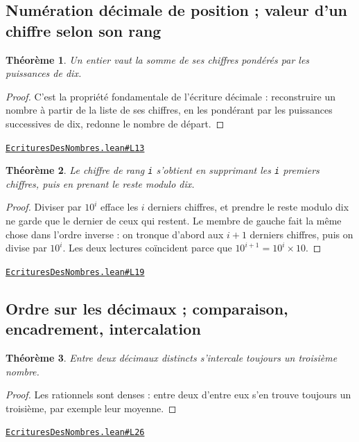 \documentclass[11pt,a4paper]{article}
\theoremstyle{definition}
\theoremstyle{plain}
\newtheorem{theoreme}{Théorème}
\newcommand{\source}[2]{\par\smallskip\noindent\hfill{\footnotesize\href{#1}{\texttt{#2}}}\par\smallskip}
\begin{document}
\subsection{Numération décimale de position ; valeur d'un chiffre selon son rang}

\begin{theoreme}
Un entier vaut la somme de ses chiffres pondérés par les puissances de dix.
\end{theoreme}

\begin{proof}
C'est la propriété fondamentale de l'écriture décimale : reconstruire un nombre à
partir de la liste de ses chiffres, en les pondérant par les puissances successives de dix,
redonne le nombre de départ.
\end{proof}
\source{https://github.com/Commutator-IO/learn-lean/blob/main/cours/01-college/01-nombres-et-calculs/EcrituresDesNombres.lean\#L13}{EcrituresDesNombres.lean\#L13}

\begin{theoreme}
Le chiffre de rang \texttt{i} s'obtient en supprimant les \texttt{i} premiers chiffres, puis en
prenant le reste modulo dix.
\end{theoreme}

\begin{proof}
Diviser par $10^i$ efface les $i$ derniers chiffres, et prendre le reste modulo dix
ne garde que le dernier de ceux qui restent. Le membre de gauche fait la même chose dans
l'ordre inverse : on tronque d'abord aux $i+1$ derniers chiffres, puis on divise par $10^i$.
Les deux lectures coïncident parce que $10^{i+1} = 10^i \times 10$.
\end{proof}
\source{https://github.com/Commutator-IO/learn-lean/blob/main/cours/01-college/01-nombres-et-calculs/EcrituresDesNombres.lean\#L19}{EcrituresDesNombres.lean\#L19}

\subsection{Ordre sur les décimaux ; comparaison, encadrement, intercalation}

\begin{theoreme}
Entre deux décimaux distincts s'intercale toujours un troisième nombre.
\end{theoreme}

\begin{proof}
Les rationnels sont denses : entre deux d'entre eux s'en trouve toujours un
troisième, par exemple leur moyenne.
\end{proof}
\source{https://github.com/Commutator-IO/learn-lean/blob/main/cours/01-college/01-nombres-et-calculs/EcrituresDesNombres.lean\#L26}{EcrituresDesNombres.lean\#L26}
\end{document}
